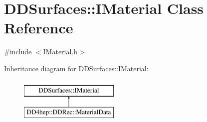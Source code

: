 \hypertarget{class_d_d_surfaces_1_1_i_material}{}\section{D\+D\+Surfaces\+:\+:I\+Material Class Reference}
\label{class_d_d_surfaces_1_1_i_material}


{\ttfamily \#include $<$I\+Material.\+h$>$}

Inheritance diagram for D\+D\+Surfaces\+:\+:I\+Material\+:\begin{figure}[H]
\begin{center}
\leavevmode
\includegraphics[height=2.000000cm]{class_d_d_surfaces_1_1_i_material}
\end{center}
\end{figure}
